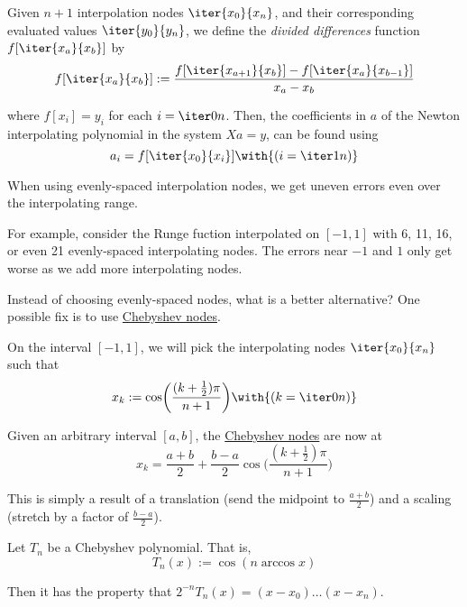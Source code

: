 Given $n+1$ interpolation nodes $\iter{x_0}{x_n}$, and their corresponding
evaluated values $\iter{y_0}{y_n}$, we define the \textit{divided differences}
function $f[\iter{x_a}{x_b}]$ by
$$
  f[\iter{x_a}{x_b}]:=\frac{f[\iter{x_{a+1}}{x_b}]-f[\iter{x_a}{x_{b-1}}]}{x_a-x_b}
$$

where $f[x_i]=y_i$ for each $i=\iter0n$. Then, the coefficients in $a$ of the
Newton interpolating polynomial in the system \href{a33bce0}{$Xa=y$}, can be
found using
$$
  a_i=f[\iter{x_0}{x_i}]\with{(i=\iter1n)}
$$


\label{c9f6104}

When using evenly-spaced interpolation nodes, we get uneven errors even over
the interpolating range.

For example, consider the Runge fuction interpolated on $[-1,1]$ with 6, 11,
16, or even 21 evenly-spaced interpolating nodes. The errors near $-1$ and $1$
only get worse as we add more interpolating nodes.

Instead of choosing evenly-spaced nodes, what is a better alternative? One
possible fix is to use \href{f07584c}{Chebyshev nodes}.

\label{f07584c}

On the interval $[-1,1]$, we will pick the interpolating nodes
$\iter{x_0}{x_n}$ such that
$$
  x_k:=\cos\biggl(\frac{(k+\frac12)\pi}{n+1}\biggr)\with{(k=\iter0n)}
$$

\label{a17dbd6}

Given an arbitrary interval $[a,b]$, the \href{f07584c}{Chebyshev nodes} are
now at
$$
  x_k=\frac{a+b}2+\frac{b-a}2\cos\biggl(\frac{(k+\frac12)\pi}{n+1}\biggr)
$$

This is simply a result of a translation (send the midpoint to $\frac{a+b}2$)
and a scaling (stretch by a factor of $\frac{b-a}2$).

\label{a0c2aca}

Let $T_n$ be a Chebyshev polynomial. That is,
$$
  T_n(x):=\cos(n\arccos x)
$$

Then it has the property that $2^{-n}T_n(x)=(x-x_0)\ldots(x-x_n)$.

